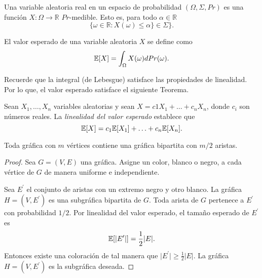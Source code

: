 \begin{definition}
  Una variable aleatoria real en un espacio de probabilidad $(\Omega,
  \Sigma, Pr)$ es una
  función $X: \Omega \rightarrow \mathbb R$ $Pr$-medible. Esto es,
  para todo $\alpha \in \mathbb R$
$$\{\omega \in \mathbb R: X(\omega) \le \alpha \} \in \Sigma \}.$$
\end{definition}

\begin{definition}
El valor esperado de una variable aleatoria $X$ se define como
$$\mathbb{E}[X] = \int_{\Omega} X(\omega) d Pr(\omega).$$
\end{definition}

Recuerde que la integral (de Lebesgue) satisface las propiedades de
linealidad. Por lo que, el valor esperado satisface el siguiente Teorema.

\begin{theorem}
    Sean $X_1, \ldots, X_n$ variables aleatorias y sean $X = c1 X_1 +
    \ldots + c_n X_n$, donde $c_i$ son números reales. La
    \textit{linealidad del valor esperado} establece que
    $$ \mathbb{E}[X] = c_1 \mathbb{E}[X_1] + \ldots + c_n \mathbb{E}[X_n]. $$
\end{theorem}

\begin{theorem}
    Toda gráfica con $m$ vértices contiene una gráfica bipartita con $m
/ 2$ aristas.
\end{theorem}
\begin{proof}
    Sea $G = (V, E)$ una gráfica. Asigne un color, blanco o negro, a
    cada vértice de $G$  de manera uniforme e independiente.

    Sea $E^\prime$ el conjunto de aristas con un extremo negro y otro
    blanco. La gráfica $H = (V, E^\prime)$ es una subgráfica bipartita de $G$.
    Toda arista de $G$ pertenece a $E^\prime$ con probabilidad $1/2$.
    Por linealidad del valor esperado, el tamaño esperado de $E^\prime$ es
    $$\mathbb{E}[\vert E^\prime \vert] = \frac{1}{2} \vert E \vert.$$
    Entonces existe una coloración de tal manera que $\vert E^\prime
    \vert \ge \frac{1}{2}\vert E \vert$. La gráfica $H = (V, E^\prime)$
    es la subgráfica deseada.
\end{proof}

%

